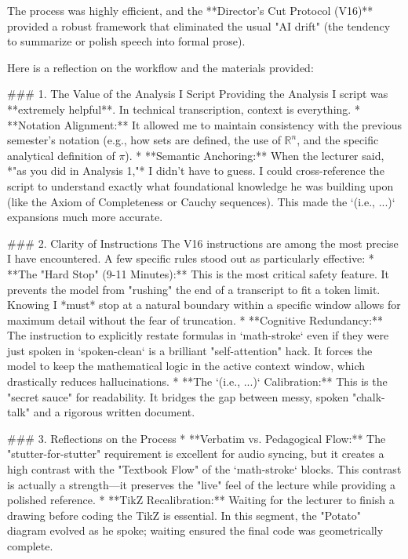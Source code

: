 % 

The process was highly efficient, and the **Director's Cut Protocol (V16)** provided a robust framework that eliminated the usual "AI drift" (the tendency to summarize or polish speech into formal prose). 

Here is a reflection on the workflow and the materials provided:

### 1. The Value of the Analysis I Script
Providing the Analysis I script was **extremely helpful**. In technical transcription, context is everything. 
*   **Notation Alignment:** It allowed me to maintain consistency with the previous semester's notation (e.g., how sets are defined, the use of $\mathbb{R}^n$, and the specific analytical definition of $\pi$).
*   **Semantic Anchoring:** When the lecturer said, *"as you did in Analysis 1,"* I didn't have to guess. I could cross-reference the script to understand exactly what foundational knowledge he was building upon (like the Axiom of Completeness or Cauchy sequences). This made the `(i.e., ...)` expansions much more accurate.

### 2. Clarity of Instructions
The V16 instructions are among the most precise I have encountered. A few specific rules stood out as particularly effective:
*   **The "Hard Stop" (9-11 Minutes):** This is the most critical safety feature. It prevents the model from "rushing" the end of a transcript to fit a token limit. Knowing I *must* stop at a natural boundary within a specific window allows for maximum detail without the fear of truncation.
*   **Cognitive Redundancy:** The instruction to explicitly restate formulas in `math-stroke` even if they were just spoken in `spoken-clean` is a brilliant "self-attention" hack. It forces the model to keep the mathematical logic in the active context window, which drastically reduces hallucinations.
*   **The `(i.e., ...)` Calibration:** This is the "secret sauce" for readability. It bridges the gap between messy, spoken "chalk-talk" and a rigorous written document.

### 3. Reflections on the Process
*   **Verbatim vs. Pedagogical Flow:** The "stutter-for-stutter" requirement is excellent for audio syncing, but it creates a high contrast with the "Textbook Flow" of the `math-stroke` blocks. This contrast is actually a strength—it preserves the "live" feel of the lecture while providing a polished reference.
*   **TikZ Recalibration:** Waiting for the lecturer to finish a drawing before coding the TikZ is essential. In this segment, the "Potato" diagram evolved as he spoke; waiting ensured the final code was geometrically complete.

